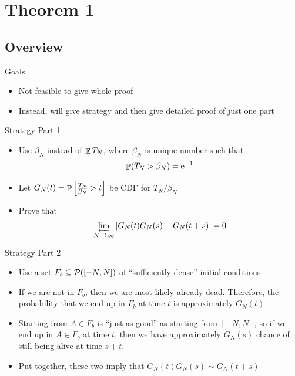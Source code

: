 \documentclass{beamer}
\begin{document}
\section{Theorem 1}

\subsection{Overview}

\begin{frame}{Goals}
  \begin{itemize}
    \item Not feasible to give whole proof
    \item Instead, will give strategy and then give detailed proof of just one part
  \end{itemize}
\end{frame}

\begin{frame}{Strategy Part 1}
  \begin{itemize}
    \item Use $\beta_{N}$ instead of $\mathop{\mathbb{E}} T_{N}$, where $\beta_{N}$ is unique number such that
    \[ \mathop{\mathbb{P}}(T_{N} > \beta_{N}) = \mathrm{e}^{-1} \]
    \pause
    \item Let $G_{N}(t) = \mathop{\mathbb{P}}\left[ \frac{T_{N}}{\beta_{N}} > t\right]$ be CDF for $T_{N} / \beta_{N}$
    \pause
    \item Prove that
    \[ \limas_{N \to \infty} \abs{G_{N}(t)G_{N}(s) - G_{N}(t+s)} = 0 \]
  \end{itemize}
\end{frame}

\begin{frame}{Strategy Part 2}
  \begin{itemize}
    \item Use a set $F_{b} \subseteq \mathcal{P}([-N,N])$ of ``sufficiently dense'' initial conditions
    \pause
    \item If we are not in $F_{b}$, then we are most likely already dead. Therefore, the probability that we end up in $F_{b}$ at time $t$ is approximately $G_{N}(t)$
    \pause
    \item Starting from $A \in F_{b}$ is ``just as good'' as starting from $[-N,N]$, so if we end up in $A \in F_{b}$ at time $t$, then we have approximately $G_{N}(s)$ chance of still being alive at time $s+t$.
    \pause
    \item Put together, these two imply that $G_{N}(t)G_{N}(s) \sim G_{N}(t+s)$
  \end{itemize}
\end{frame}
\end{document}
